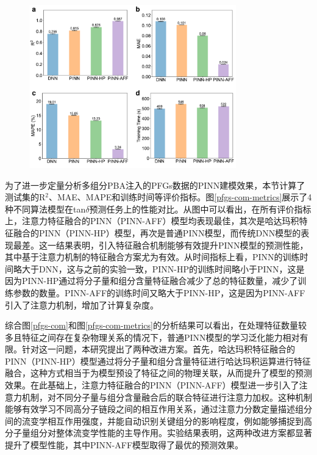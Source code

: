 \begin{figure}[htbp]
  \centering
  \includegraphics[width=0.8\textwidth]{Fig/pfgs-com-metrics.pdf}
\end{figure}
为了进一步定量分析多组分PBA注入的PFGs数据的PINN建模效果，本节计算了测试集的R$^2$、MAE、MAPE和训练时间等评价指标。图\ref{pfgs-com-metrics}展示了4种不同算法模型在tan$\delta$预测任务上的性能对比。从图中可以看出，在所有评价指标上，注意力特征融合的PINN（PINN-AFF）模型均表现最佳，其次是哈达玛积特征融合的PINN（PINN-HP）模型，再次是普通PINN模型，而传统DNN模型的表现最差。这一结果表明，引入特征融合机制能够有效提升PINN模型的预测性能，其中基于注意力机制的特征融合方案尤为有效。从时间指标上看，PINN的训练时间略大于DNN，这与之前的实验一致，PINN-HP的训练时间略小于PINN，这是因为PINN-HP通过将分子量和组分含量特征融合减少了总的特征数量，减少了训练参数的数量。PINN-AFF的训练时间又略大于PINN-HP，这是因为PINN-AFF引入了注意力机制，增加了计算复杂度。


综合图\ref{pfgs-com}和图\ref{pfgs-com-metrics}的分析结果可以看出，在处理特征数量较多且特征之间存在复杂物理关系的情况下，普通PINN模型的学习泛化能力相对有限。针对这一问题，本研究提出了两种改进方案。首先，哈达玛积特征融合的PINN（PINN-HP）模型通过将分子量和组分含量特征进行哈达玛积运算进行特征融合，这种方式相当于为模型预设了特征之间的物理关联，从而提升了模型的预测效果。在此基础上，注意力特征融合的PINN（PINN-AFF）模型进一步引入了注意力机制，对不同分子量与组分含量融合后的联合特征进行注意力加权。这种机制能够有效学习不同高分子链段之间的相互作用关系，通过注意力分数定量描述组分间的流变学相互作用强度，并能自动识别关键组分的影响程度，例如能够捕捉到高分子量组分对整体流变学性能的主导作用。实验结果表明，这两种改进方案都显著提升了模型性能，其中PINN-AFF模型取得了最优的预测效果。

